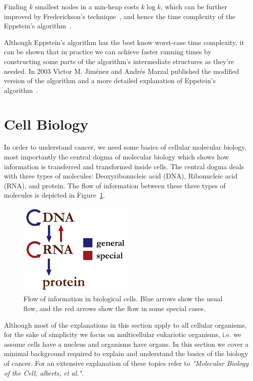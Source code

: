 Finding $k$ smallest nodes in a min-heap costs $k\log k$, which can be further improved by Frederickson's technique~\cite{frederickson1993optimal}, and hence the time complexity of the Eppstein's algorithm~\cite[Lemma 7]{eppstein1998finding}.

Although Eppstein's algorithm has the best know worst-case time complexity, it can be shown that in practice we can achieve faster running times by constructing some parts of the algorithm's intermediate structures as they're needed. In 2003 V{\'\i}ctor M. Jim{\'e}nez and Andr{\'e}s Marzal published the modified version of the algorithm and a more detailed explanation of Eppstein's algorithm~\cite{jimenez2003lazy}.

\section{Cell Biology}
In order to understand cancer, we need some basics of cellular molecular biology, most importantly the central dogma of molecular biology which shows how information is transferred and transformed inside cells. The central dogma deals with three types of molecules: Deoxyribonucleic acid (DNA), Ribonucleic acid (RNA), and protein. The flow of information between these three types of molecules is depicted in Figure~\ref{fig:bkg:central-dogma}.

\begin{figure}[!ht]
  \centering
  \includegraphics[width=0.5\textwidth]{figs/background/Centraldogma_nodetails}
  \caption{Flow of information in biological cells. Blue arrows show the usual flow, and the red arrows show the flow in some special cases.}
  \label{fig:bkg:central-dogma}
\end{figure}

Although most of the explanations in this section apply to all cellular organisms, for the sake of simplicity we focus on multicellular eukariotic organisms, i.e. we assume cells have a nucleus and organisms have organs. In this section we cover a minimal background required to explain and understand the basics of the biology of cancer. For an extensive explanation of these topics refer to \emph{"Molecular Biology of the Cell, alberts, et al."}\cite{the-cell}.

